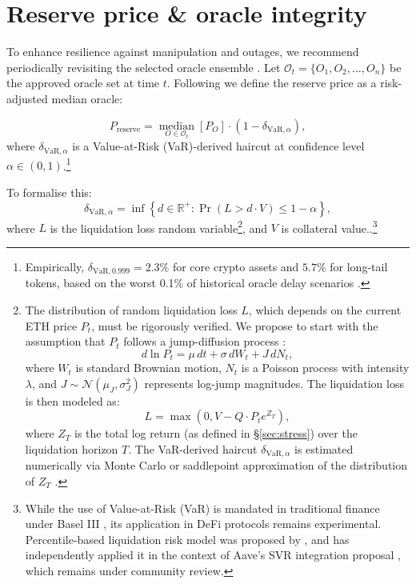 \documentclass[11pt]{article}
\newcommand{\secref}[1]{\hyperref[#1]{\S\ref*{#1}}}
\begin{document}
\section{Reserve price \& oracle integrity}
\label{sec:reserve}
To enhance resilience against manipulation and outages, we recommend periodically revisiting the selected oracle ensemble \parencite{deng2024safeguarding}. Let \(\mathcal{O}_t = \{O_{1}, O_{2}, \dots, O_{n}\}\) be the approved oracle set at time \(t\). Following \textcite{eskandari2021sok} we define the reserve price as a risk-adjusted median oracle:

\[
P_{\text{reserve}} = \operatorname*{median}_{O \in \mathcal{O}_t} \left[ P_{O} \right] \cdot (1 - \delta_{\text{VaR}, \alpha}),
\]
where \(\delta_{\text{VaR}, \alpha}\) is a Value-at-Risk (VaR)-derived haircut at confidence level \(\alpha \in (0,1)\).\footnote{Empirically, \(\delta_{\text{VaR}, 0.999} = 2.3\%\) for core crypto assets and \(5.7\%\) for long-tail tokens, based on the worst 0.1\% of historical oracle delay scenarios \parencite[Fig.~10]{tian2025defi}.}

\medskip

To formalise this:
\[
\delta_{\text{VaR}, \alpha} = \inf\left\{ d \in \mathbb{R}^+ : \Pr\left(L > d \cdot V\right) \leq 1 - \alpha \right\},
\]
where \( L \) is the liquidation loss random variable\footnote{The distribution of random liquidation loss \(L\), which depends on the current ETH price \(P_t\), must be rigorously verified. We propose to start with the assumption that \(P_t\) follows a jump-diffusion process \parencite{merton1976option}:
\[
d\ln P_t = \mu\, dt + \sigma\, dW_t + J\, dN_t,
\]
where \(W_t\) is standard Brownian motion, \(N_t\) is a Poisson process with intensity \(\lambda\), and \(J \sim \mathcal{N}(\mu_J, \sigma_J^2)\) represents log-jump magnitudes. The liquidation loss is then modeled as:
\[
L = \max\left(0, V - Q \cdot P_t e^{Z_T} \right),
\]
where \(Z_T\) is the total log return  (as defined in \secref{sec:stress}) over the liquidation horizon \(T\). The VaR-derived haircut \(\delta_{\text{VaR}, \alpha}\) is estimated numerically via Monte Carlo or saddlepoint approximation of the distribution of \(Z_T\) \parencite{kou2002jump}.}, and \( V \) is collateral value.\parencite{bcbs_marketrisk_2019}.\footnote{While the use of Value-at-Risk (VaR) is mandated in traditional finance under Basel III \parencite{bcbs_baselIII_2017}, its application in DeFi protocols remains experimental. Percentile-based liquidation risk model was proposed by \textcite{chainlink2025svr}, and \textcite{llamarisk2025svrreview} has independently applied it in the context of Aave's SVR integration proposal , which remains under community review.}
\end{document}
